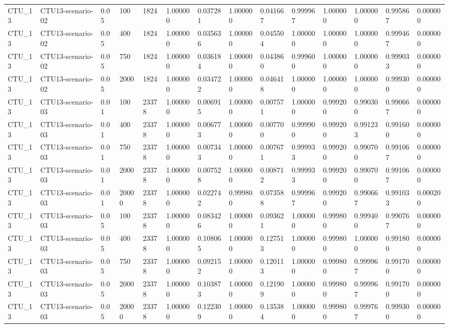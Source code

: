 \begin{tabular}{llllllllllllll}
CTU\_13 & CTU13-scenario-02 & 0.05 & 100 & 1824 & 1.000000 & 0.037281 & 1.000000 & 0.041667 & 0.999967 & 1.000000 & 1.000000 & 0.995867 & 0.000000 \\
CTU\_13 & CTU13-scenario-02 & 0.05 & 400 & 1824 & 1.000000 & 0.035636 & 1.000000 & 0.045504 & 1.000000 & 1.000000 & 1.000000 & 0.999467 & 0.000000 \\
CTU\_13 & CTU13-scenario-02 & 0.05 & 750 & 1824 & 1.000000 & 0.036184 & 1.000000 & 0.043860 & 0.999600 & 1.000000 & 1.000000 & 0.999033 & 0.000000 \\
CTU\_13 & CTU13-scenario-02 & 0.05 & 2000 & 1824 & 1.000000 & 0.034722 & 1.000000 & 0.046418 & 1.000000 & 1.000000 & 1.000000 & 0.999300 & 0.000000 \\
CTU\_13 & CTU13-scenario-03 & 0.01 & 100 & 23378 & 1.000000 & 0.006915 & 1.000000 & 0.007571 & 1.000000 & 0.999200 & 0.990300 & 0.990667 & 0.000000 \\
CTU\_13 & CTU13-scenario-03 & 0.01 & 400 & 23378 & 1.000000 & 0.006773 & 1.000000 & 0.007700 & 0.999900 & 0.999200 & 0.991233 & 0.991600 & 0.000000 \\
CTU\_13 & CTU13-scenario-03 & 0.01 & 750 & 23378 & 1.000000 & 0.007343 & 1.000000 & 0.007671 & 0.999933 & 0.999200 & 0.990700 & 0.991067 & 0.000000 \\
CTU\_13 & CTU13-scenario-03 & 0.01 & 2000 & 23378 & 1.000000 & 0.007528 & 1.000000 & 0.008712 & 0.999933 & 0.999200 & 0.990700 & 0.991067 & 0.000000 \\
CTU\_13 & CTU13-scenario-03 & 0.01 & 20000 & 23378 & 1.000000 & 0.022742 & 0.999800 & 0.073588 & 0.999967 & 0.999200 & 0.990667 & 0.991033 & 0.000200 \\
CTU\_13 & CTU13-scenario-03 & 0.05 & 100 & 23378 & 1.000000 & 0.083426 & 1.000000 & 0.093621 & 1.000000 & 0.999800 & 0.999400 & 0.990767 & 0.000000 \\
CTU\_13 & CTU13-scenario-03 & 0.05 & 400 & 23378 & 1.000000 & 0.108065 & 1.000000 & 0.127513 & 1.000000 & 0.999800 & 1.000000 & 0.991800 & 0.000000 \\
CTU\_13 & CTU13-scenario-03 & 0.05 & 750 & 23378 & 1.000000 & 0.092152 & 1.000000 & 0.120113 & 1.000000 & 0.999800 & 0.999967 & 0.991700 & 0.000000 \\
CTU\_13 & CTU13-scenario-03 & 0.05 & 2000 & 23378 & 1.000000 & 0.103873 & 1.000000 & 0.121909 & 1.000000 & 0.999800 & 0.999967 & 0.991700 & 0.000000 \\
CTU\_13 & CTU13-scenario-03 & 0.05 & 20000 & 23378 & 1.000000 & 0.122309 & 1.000000 & 0.135384 & 1.000000 & 0.999800 & 0.999767 & 0.999300 & 0.000000 \\

\end{tabular}
